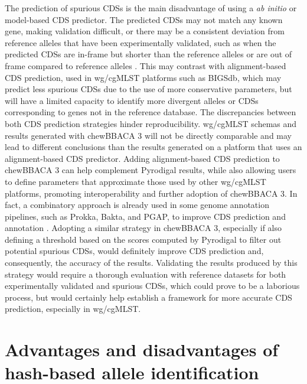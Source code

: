 The prediction of spurious \ac{CDSs} is the main disadvantage of using a \textit{ab initio} or model-based \ac{CDS} predictor. The predicted \ac{CDSs} may not match any known gene, making validation difficult, or there may be a consistent deviation from reference alleles that have been experimentally validated, such as when the predicted \ac{CDSs} are in-frame but shorter than the reference alleles or are out of frame compared to reference alleles \cite{dimonaco_no_2022}. This may contrast with alignment-based \ac{CDS} prediction, used in \ac{wg/cgMLST} platforms such as \ac{BIGSdb}, which may predict less spurious \ac{CDSs} due to the use of more conservative parameters, but will have a limited capacity to identify more divergent alleles or \ac{CDSs} corresponding to genes not in the reference database. The discrepancies between both \ac{CDS} prediction strategies hinder reproducibility. wg/cgMLST schemas and results generated with chewBBACA 3 will not be directly comparable and may lead to different conclusions than the results generated on a platform that uses an alignment-based \ac{CDS} predictor. Adding alignment-based CDS prediction to chewBBACA 3 can help complement Pyrodigal results, while also allowing users to define parameters that approximate those used by other \ac{wg/cgMLST} platforms, promoting interoperability and further adoption of chewBBACA 3. In fact, a combinatory approach is already used in some genome annotation pipelines, such as Prokka, Bakta, and PGAP, to improve \ac{CDS} prediction and annotation \cite{seemann_prokka_2014, schwengers_bakta_2021, li_refseq_2021}. Adopting a similar strategy in chewBBACA 3, especially if also defining a threshold based on the scores computed by Pyrodigal to filter out potential spurious \ac{CDSs}, would definitely improve \ac{CDS} prediction and, consequently, the accuracy of the results. Validating the results produced by this strategy would require a thorough evaluation with reference datasets for both experimentally validated and spurious \ac{CDSs}, which could prove to be a laborious process, but would certainly help establish a framework for more accurate \ac{CDS} prediction, especially in \ac{wg/cgMLST}.

\section{Advantages and disadvantages of hash-based allele identification}

